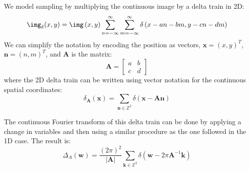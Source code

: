 We model sampling by multiplying the continuous image by a delta train in 2D:
\begin{equation}
    \img_{\delta} (x,y) = \img \left( x,y \right) \sum_{n=-\infty}^{\infty} \sum_{m=-\infty}^{\infty} \delta \left( x- an-bm, y - cn-dm \right)
\end{equation}
We can simplify the notation by encoding the position as vectors, $\mathbf{x} = (x,y)^T$,  $\mathbf{n} = (n,m)^T$, and $\mathbf{A}$ is the matrix:
\begin{equation}
    \mathbf{A} = \left[
        \begin{array}{cc}
            a & b \\
            c & d
        \end{array}
        \right]
\end{equation}
where the 2D delta train can be written using vector notation for the continuous spatial coordinates:
\begin{equation}
    \delta_{\mathbf{A}}(\mathbf{x}) = \sum_{\mathbf{n} \in \mathbb{Z}^2} \delta \left( \mathbf{x} - \mathbf{A} \mathbf{n} \right)
\end{equation}



The continuous Fourier transform of this delta train can be done by applying a change in variables and then using a similar procedure as the one followed in the 1D case. The result is:
\begin{equation}
    \Delta_{A} (\mathbf{w}) = \frac{(2 \pi)^2}{|\mathbf{A}|} \sum_{\mathbf{k} \in \mathbb{Z}^2} \delta \left( \mathbf{w} - 2 \pi \mathbf{A}^{-1} \mathbf{k} \right)
\end{equation}

